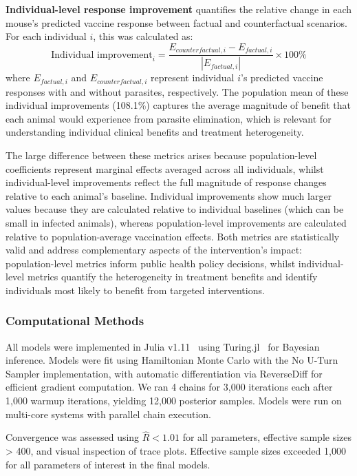 \documentclass[a4paper, hidelinks, 11pt]{article}
\begin{document}
\begin{appendices}
	\textbf{Individual-level response improvement} quantifies the relative change in each mouse's predicted vaccine response between factual and counterfactual scenarios. For each individual $i$, this was calculated as:
	$$\text{Individual improvement}_i = \frac{E_{counterfactual,i} - E_{factual,i}}{|E_{factual,i}|} \times 100\%$$
	where $E_{factual,i}$ and $E_{counterfactual,i}$ represent individual $i$'s predicted vaccine responses with and without parasites, respectively. The population mean of these individual improvements (108.1\%) captures the average magnitude of benefit that each animal would experience from parasite elimination, which is relevant for understanding individual clinical benefits and treatment heterogeneity.

	The large difference between these metrics arises because population-level coefficients represent marginal effects averaged across all individuals, whilst individual-level improvements reflect the full magnitude of response changes relative to each animal's baseline. Individual improvements show much larger values because they are calculated relative to individual baselines (which can be small in infected animals), whereas population-level improvements are calculated relative to population-average vaccination effects. Both metrics are statistically valid and address complementary aspects of the intervention's impact: population-level metrics inform public health policy decisions, whilst individual-level metrics quantify the heterogeneity in treatment benefits and identify individuals most likely to benefit from targeted interventions.

	\subsubsection{Computational Methods}\label{supdata:Computation}

	All models were implemented in Julia v1.11~\cite{Bezanson2017} using Turing.jl~\cite{ge2018t} for Bayesian inference. Models were fit using Hamiltonian Monte Carlo with the No U-Turn Sampler implementation, with automatic differentiation via ReverseDiff for efficient gradient computation. We ran 4 chains for 3,000 iterations each after 1,000 warmup iterations, yielding 12,000 posterior samples. Models were run on multi-core systems with parallel chain execution.

	Convergence was assessed using $\hat{R} < 1.01$ for all parameters, effective sample sizes > 400, and visual inspection of trace plots. Effective sample sizes exceeded 1,000 for all parameters of interest in the final models.


\end{appendices}
\end{document}
